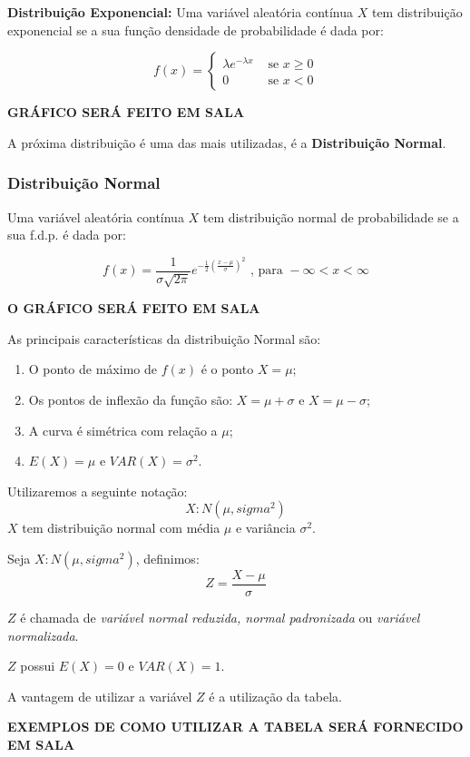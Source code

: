 \documentclass[oneside,a4paper,12pt]{article}
\begin{document}
{\bf Distribuição Exponencial:} Uma variável aleatória contínua $X$ tem distribuição exponencial se a sua função densidade de probabilidade é dada por:

$$
f(x) = 
\begin{cases}
\lambda e^{-\lambda x} & \text{ se } x \geq 0 \\
0 & \text{ se } x < 0
\end{cases}
$$

{\bf GRÁFICO SERÁ FEITO EM SALA}

A próxima distribuição é uma das mais utilizadas, é a {\bf Distribuição Normal}.

\subsubsection{Distribuição Normal}

Uma variável aleatória contínua $X$ tem distribuição normal de probabilidade se a sua f.d.p. é dada por:

$$
f(x) = \displaystyle \frac{1}{\sigma \sqrt{2\pi}}e^{- \displaystyle \frac{1}{2}\left( \displaystyle \frac{x - \mu}{\sigma} \right)^2 } \text{ , para } -\infty < x < \infty
$$

{\bf O GRÁFICO SERÁ FEITO EM SALA}

As principais características da distribuição Normal são:
\begin{enumerate}
	\item O ponto de máximo de $f(x)$ é o ponto $X = \mu$;
	\item Os pontos de inflexão da função são: $X = \mu + \sigma$ e $X = \mu - \sigma$;
	\item A curva é simétrica com relação a $\mu$;
	\item $E(X) = \mu$ e $VAR(X) = \sigma^2$.
\end{enumerate}

Utilizaremos a seguinte notação:
$$X: N(\mu,sigma^2)$$
$X$ tem distribuição normal com média $\mu$ e variância $\sigma^2$.

Seja $X: N(\mu,sigma^2)$, definimos:
$$Z = \displaystyle \frac{X - \mu}{\sigma}$$

$Z$ é chamada de \emph{variável normal reduzida, normal padronizada} ou \emph{variável normalizada}.

$Z$ possui $E(X) = 0$ e $VAR(X) = 1$.

A vantagem de utilizar a variável $Z$ é a utilização da tabela.

{\bf EXEMPLOS DE COMO UTILIZAR A TABELA SERÁ FORNECIDO EM SALA}
\end{document}
